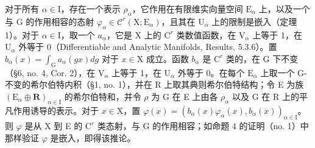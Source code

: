 对于所有 \(\alpha \in \mathrm{I}\)，存在一个表示 \(\rho_{\alpha}\)，它作用在有限维实向量空间 \(\mathrm{E}_{\alpha}\) 上，以及一个与 G 的作用相容的态射 \(\varphi_{\alpha} \in \mathcal{C}^r (\mathrm{X};\mathrm{E}_{\alpha})\)，且其在 \(\mathrm{U}_{\alpha}\) 上的限制是嵌入（定理 1）。对于 \(\alpha \in \mathrm{I}\)，取一个 \(a_{\alpha}\)，它是 X 上的 \(\mathrm{C}^r\) 类数值函数，在 \(\mathrm{V}_{\alpha}\) 上等于 1，在 \(\mathrm{U}_{\alpha}\) 外等于 0（Differentiable and Analytic Manifolds, Results, 5.3.6）。置 \(b_{\alpha}(x) = \int_{\mathrm{G}} a_{\alpha}(gx) dg\) 对于 \(x \in \mathrm{X}\) 成立。函数 \(b_{\alpha}\) 是 \(\mathrm{C}^r\) 类的，在 G 下不变（§6, no. 4, Cor. 2），在 \(\mathrm{V}_{\alpha}\) 上等于 1，在 \(\mathrm{U}_{\alpha}\) 外等于 0。在每个 \(\mathrm{E}_{\alpha}\) 上取一个 G-不变的希尔伯特内积（§1, no. 1），并在 R 上取其典则希尔伯特结构；令 E 为族 \((\mathrm{E}_{\alpha} \oplus \mathbf{R})_{\alpha \in \mathrm{I}}\) 的希尔伯特和，并令 \(\rho\) 为 G 在 E 上由各 \(\rho_{\alpha}\) 以及 G 在 R 上的平凡作用诱导的表示。对于 \(x \in \mathrm{X}\)，置 \(\varphi(x) = (b_{\alpha}(x)\varphi_{\alpha}(x), b_{\alpha}(x))_{\alpha \in \mathrm{I}}\)。则 \(\varphi\) 是从 X 到 E 的 \(\mathrm{C}^r\) 类态射，与 G 的作用相容；如命题 4 的证明（no. 1）中那样验证 \(\varphi\) 是嵌入，即得该推论。

